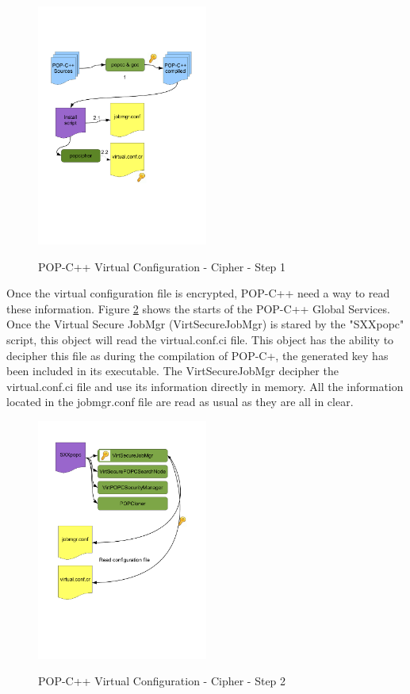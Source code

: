 \begin{figure}[ht]
	\caption{POP-C++ Virtual Configuration - Cipher - Step 1}
  	\centering
	\includegraphics[width=0.5\textwidth]{./pic/cipher1.pdf}
	\label{fig:cipher1}
\end{figure}


Once the virtual configuration file is encrypted, POP-C++ need a way to read these information. Figure \ref{fig:cipher2} shows the starts of the POP-C++ Global Services. Once the Virtual Secure JobMgr (VirtSecureJobMgr) is stared by the "SXXpopc" script, this object will read the virtual.conf.ci file. This object has the ability to decipher this file as during the compilation of POP-C+, the generated key has been included in its executable. The VirtSecureJobMgr decipher the virtual.conf.ci file and use its information directly in memory. All the information located in the jobmgr.conf file are read as usual as they are all in clear. \s
\begin{figure}[ht]
	\caption{POP-C++ Virtual Configuration - Cipher - Step 2}
  	\centering
	\includegraphics[width=0.5\textwidth]{./pic/cipher2.pdf}
	\label{fig:cipher2}
\end{figure}


